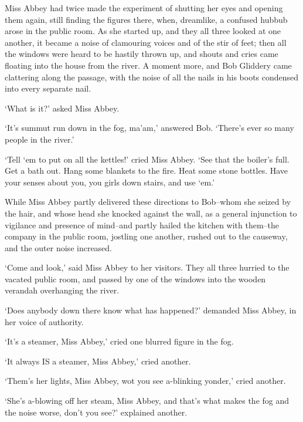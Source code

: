 Miss Abbey had twice made the experiment of shutting her eyes and
opening them again, still finding the figures there, when, dreamlike,
a confused hubbub arose in the public room. As she started up, and they
all three looked at one another, it became a noise of clamouring voices
and of the stir of feet; then all the windows were heard to be hastily
thrown up, and shouts and cries came floating into the house from
the river. A moment more, and Bob Gliddery came clattering along the
passage, with the noise of all the nails in his boots condensed into
every separate nail.

‘What is it?’ asked Miss Abbey.

‘It’s summut run down in the fog, ma’am,’ answered Bob. ‘There’s ever so
many people in the river.’

‘Tell ‘em to put on all the kettles!’ cried Miss Abbey. ‘See that the
boiler’s full. Get a bath out. Hang some blankets to the fire. Heat some
stone bottles. Have your senses about you, you girls down stairs, and
use ‘em.’

While Miss Abbey partly delivered these directions to Bob--whom she
seized by the hair, and whose head she knocked against the wall, as a
general injunction to vigilance and presence of mind--and partly hailed
the kitchen with them--the company in the public room, jostling one
another, rushed out to the causeway, and the outer noise increased.

‘Come and look,’ said Miss Abbey to her visitors. They all three hurried
to the vacated public room, and passed by one of the windows into the
wooden verandah overhanging the river.

‘Does anybody down there know what has happened?’ demanded Miss Abbey,
in her voice of authority.

‘It’s a steamer, Miss Abbey,’ cried one blurred figure in the fog.

‘It always IS a steamer, Miss Abbey,’ cried another.

‘Them’s her lights, Miss Abbey, wot you see a-blinking yonder,’ cried
another.

‘She’s a-blowing off her steam, Miss Abbey, and that’s what makes the
fog and the noise worse, don’t you see?’ explained another.

